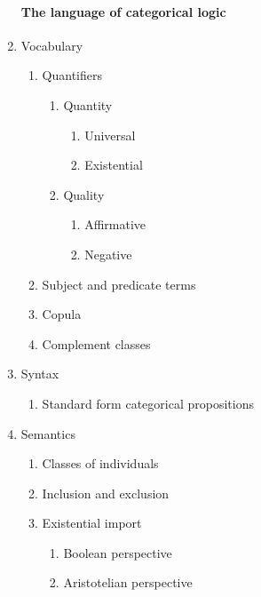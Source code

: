 \documentclass[10pt,landscape]{article}
\begin{document}
\begin{multicols}{2}
\begin{enumerate}
\paragraph{The language of categorical logic}
    \item Vocabulary
      \begin{enumerate}
       \item Quantifiers
	 \begin{enumerate}
	  \item Quantity
	    \begin{enumerate}
	     \item Universal
	     \item Existential
	    \end{enumerate}
	  \item Quality
	    \begin{enumerate}
	     \item Affirmative
	     \item Negative
	    \end{enumerate}
	 \end{enumerate}
       \item Subject and predicate terms
       \item Copula
       \item Complement classes
      \end{enumerate}
   \item Syntax
      \begin{enumerate}
       \item Standard form categorical propositions
      \end{enumerate}
   \item Semantics
      \begin{enumerate}
       \item Classes of individuals
       \item Inclusion and exclusion
       \item Existential import
	  \begin{enumerate}
	   \item Boolean perspective
	   \item Aristotelian perspective
	  \end{enumerate}
      \end{enumerate}


\end{enumerate}
\end{multicols}
\end{document}
